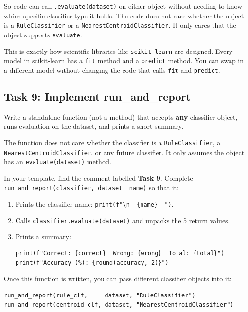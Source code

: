 \noindent
So code can call \texttt{.evaluate(dataset)} on either object without needing to know which specific classifier type it holds.
The code does not care whether the object is a \texttt{RuleClassifier} or a \texttt{NearestCentroidClassifier}.
It only cares that the object supports \texttt{evaluate}.

\medskip
\noindent
This is exactly how scientific libraries like \texttt{scikit-learn} are designed.
Every model in scikit-learn has a \texttt{fit} method and a \texttt{predict} method.
You can swap in a different model without changing the code that calls \texttt{fit} and \texttt{predict}.

\subsection{Task 9: Implement run\_and\_report}

\begin{tcolorbox}[title=Task 9: Implement run\_and\_report]
Write a standalone function (not a method) that accepts \textbf{any} classifier object, runs evaluation on the dataset, and prints a short summary.

\medskip
\noindent
The function does not care whether the classifier is a \texttt{RuleClassifier}, a \texttt{NearestCentroidClassifier}, or any future classifier.
It only assumes the object has an \texttt{evaluate(dataset)} method.

\medskip
\noindent
In your template, find the comment labelled \textbf{Task 9}.
Complete \texttt{run\_and\_report(classifier, dataset, name)} so that it:
\begin{enumerate}
    \item Prints the classifier name: \texttt{print(f"\textbackslash n--- \{name\} ---")}.
    \item Calls \texttt{classifier.evaluate(dataset)} and unpacks the 5 return values.
    \item Prints a summary:
\begin{verbatim}
print(f"Correct: {correct}  Wrong: {wrong}  Total: {total}")
print(f"Accuracy (%): {round(accuracy, 2)}")
\end{verbatim}
\end{enumerate}
\end{tcolorbox}

\noindent
Once this function is written, you can pass different classifier objects into it:

\begin{verbatim}
run_and_report(rule_clf,     dataset, "RuleClassifier")
run_and_report(centroid_clf, dataset, "NearestCentroidClassifier")
\end{verbatim}

